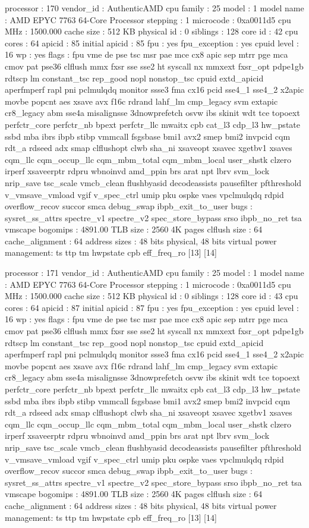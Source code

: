 processor	: 170
vendor_id	: AuthenticAMD
cpu family	: 25
model		: 1
model name	: AMD EPYC 7763 64-Core Processor
stepping	: 1
microcode	: 0xa0011d5
cpu MHz		: 1500.000
cache size	: 512 KB
physical id	: 0
siblings	: 128
core id		: 42
cpu cores	: 64
apicid		: 85
initial apicid	: 85
fpu		: yes
fpu_exception	: yes
cpuid level	: 16
wp		: yes
flags		: fpu vme de pse tsc msr pae mce cx8 apic sep mtrr pge mca cmov pat pse36 clflush mmx fxsr sse sse2 ht syscall nx mmxext fxsr_opt pdpe1gb rdtscp lm constant_tsc rep_good nopl nonstop_tsc cpuid extd_apicid aperfmperf rapl pni pclmulqdq monitor ssse3 fma cx16 pcid sse4_1 sse4_2 x2apic movbe popcnt aes xsave avx f16c rdrand lahf_lm cmp_legacy svm extapic cr8_legacy abm sse4a misalignsse 3dnowprefetch osvw ibs skinit wdt tce topoext perfctr_core perfctr_nb bpext perfctr_llc mwaitx cpb cat_l3 cdp_l3 hw_pstate ssbd mba ibrs ibpb stibp vmmcall fsgsbase bmi1 avx2 smep bmi2 invpcid cqm rdt_a rdseed adx smap clflushopt clwb sha_ni xsaveopt xsavec xgetbv1 xsaves cqm_llc cqm_occup_llc cqm_mbm_total cqm_mbm_local user_shstk clzero irperf xsaveerptr rdpru wbnoinvd amd_ppin brs arat npt lbrv svm_lock nrip_save tsc_scale vmcb_clean flushbyasid decodeassists pausefilter pfthreshold v_vmsave_vmload vgif v_spec_ctrl umip pku ospke vaes vpclmulqdq rdpid overflow_recov succor smca debug_swap ibpb_exit_to_user
bugs		: sysret_ss_attrs spectre_v1 spectre_v2 spec_store_bypass srso ibpb_no_ret tsa vmscape
bogomips	: 4891.00
TLB size	: 2560 4K pages
clflush size	: 64
cache_alignment	: 64
address sizes	: 48 bits physical, 48 bits virtual
power management: ts ttp tm hwpstate cpb eff_freq_ro [13] [14]

processor	: 171
vendor_id	: AuthenticAMD
cpu family	: 25
model		: 1
model name	: AMD EPYC 7763 64-Core Processor
stepping	: 1
microcode	: 0xa0011d5
cpu MHz		: 1500.000
cache size	: 512 KB
physical id	: 0
siblings	: 128
core id		: 43
cpu cores	: 64
apicid		: 87
initial apicid	: 87
fpu		: yes
fpu_exception	: yes
cpuid level	: 16
wp		: yes
flags		: fpu vme de pse tsc msr pae mce cx8 apic sep mtrr pge mca cmov pat pse36 clflush mmx fxsr sse sse2 ht syscall nx mmxext fxsr_opt pdpe1gb rdtscp lm constant_tsc rep_good nopl nonstop_tsc cpuid extd_apicid aperfmperf rapl pni pclmulqdq monitor ssse3 fma cx16 pcid sse4_1 sse4_2 x2apic movbe popcnt aes xsave avx f16c rdrand lahf_lm cmp_legacy svm extapic cr8_legacy abm sse4a misalignsse 3dnowprefetch osvw ibs skinit wdt tce topoext perfctr_core perfctr_nb bpext perfctr_llc mwaitx cpb cat_l3 cdp_l3 hw_pstate ssbd mba ibrs ibpb stibp vmmcall fsgsbase bmi1 avx2 smep bmi2 invpcid cqm rdt_a rdseed adx smap clflushopt clwb sha_ni xsaveopt xsavec xgetbv1 xsaves cqm_llc cqm_occup_llc cqm_mbm_total cqm_mbm_local user_shstk clzero irperf xsaveerptr rdpru wbnoinvd amd_ppin brs arat npt lbrv svm_lock nrip_save tsc_scale vmcb_clean flushbyasid decodeassists pausefilter pfthreshold v_vmsave_vmload vgif v_spec_ctrl umip pku ospke vaes vpclmulqdq rdpid overflow_recov succor smca debug_swap ibpb_exit_to_user
bugs		: sysret_ss_attrs spectre_v1 spectre_v2 spec_store_bypass srso ibpb_no_ret tsa vmscape
bogomips	: 4891.00
TLB size	: 2560 4K pages
clflush size	: 64
cache_alignment	: 64
address sizes	: 48 bits physical, 48 bits virtual
power management: ts ttp tm hwpstate cpb eff_freq_ro [13] [14]

